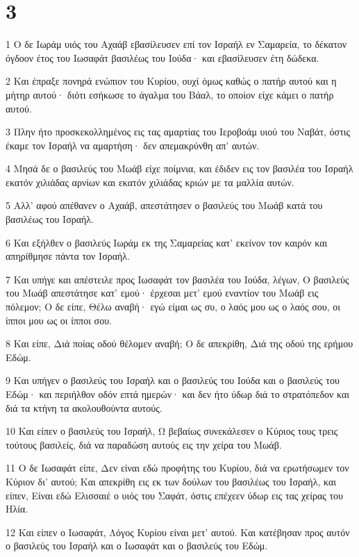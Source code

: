 \chapter{3}

\par 1 Ο δε Ιωράμ υιός του Αχαάβ εβασίλευσεν επί τον Ισραήλ εν Σαμαρεία, το δέκατον όγδοον έτος του Ιωσαφάτ βασιλέως του Ιούδα· και εβασίλευσεν έτη δώδεκα.
\par 2 Και έπραξε πονηρά ενώπιον του Κυρίου, ουχί όμως καθώς ο πατήρ αυτού και η μήτηρ αυτού· διότι εσήκωσε το άγαλμα του Βάαλ, το οποίον είχε κάμει ο πατήρ αυτού.
\par 3 Πλην ήτο προσκεκολλημένος εις τας αμαρτίας του Ιεροβοάμ υιού του Ναβάτ, όστις έκαμε τον Ισραήλ να αμαρτήση· δεν απεμακρύνθη απ' αυτών.
\par 4 Μησά δε ο βασιλεύς του Μωάβ είχε ποίμνια, και έδιδεν εις τον βασιλέα του Ισραήλ εκατόν χιλιάδας αρνίων και εκατόν χιλιάδας κριών με τα μαλλία αυτών.
\par 5 Αλλ' αφού απέθανεν ο Αχαάβ, απεστάτησεν ο βασιλεύς του Μωάβ κατά του βασιλέως του Ισραήλ.
\par 6 Και εξήλθεν ο βασιλεύς Ιωράμ εκ της Σαμαρείας κατ' εκείνον τον καιρόν και απηρίθμησε πάντα τον Ισραήλ.
\par 7 Και υπήγε και απέστειλε προς Ιωσαφάτ τον βασιλέα του Ιούδα, λέγων, Ο βασιλεύς του Μωάβ απεστάτησε κατ' εμού· έρχεσαι μετ' εμού εναντίον του Μωάβ εις πόλεμον; Ο δε είπε, Θέλω αναβή· εγώ είμαι ως συ, ο λαός μου ως ο λαός σου, οι ίπποι μου ως οι ίπποι σου.
\par 8 Και είπε, Διά ποίας οδού θέλομεν αναβή; Ο δε απεκρίθη, Διά της οδού της ερήμου Εδώμ.
\par 9 Και υπήγεν ο βασιλεύς του Ισραήλ και ο βασιλεύς του Ιούδα και ο βασιλεύς του Εδώμ· και περιήλθον οδόν επτά ημερών· και δεν ήτο ύδωρ διά το στρατόπεδον και διά τα κτήνη τα ακολουθούντα αυτούς.
\par 10 Και είπεν ο βασιλεύς του Ισραήλ, Ω βεβαίως συνεκάλεσεν ο Κύριος τους τρεις τούτους βασιλείς, διά να παραδώση αυτούς εις την χείρα του Μωάβ.
\par 11 Ο δε Ιωσαφάτ είπε, Δεν είναι εδώ προφήτης του Κυρίου, διά να ερωτήσωμεν τον Κύριον δι' αυτού; Και απεκρίθη εις εκ των δούλων του βασιλέως του Ισραήλ, και είπεν, Είναι εδώ Ελισσαιέ ο υιός του Σαφάτ, όστις επέχεεν ύδωρ εις τας χείρας του Ηλία.
\par 12 Και είπεν ο Ιωσαφάτ, Λόγος Κυρίου είναι μετ' αυτού. Και κατέβησαν προς αυτόν ο βασιλεύς του Ισραήλ και ο Ιωσαφάτ και ο βασιλεύς του Εδώμ.
